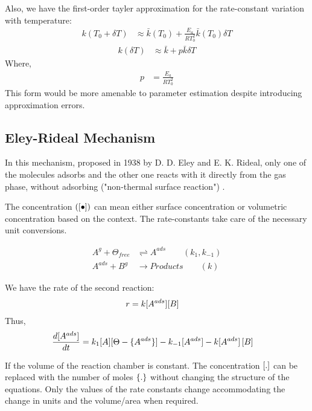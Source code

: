Also, we have the first-order tayler approximation for the rate-constant
variation with temperature:
\begin{align*}
    k(T_0 + \delta T) &\approx \bar k(T_0) + \frac{E_a}{RT_0^2} \bar k(T_0) \delta T
\end{align*}
\begin{align}
    k(\delta T) &\approx \bar k + p \bar k \delta T
\end{align}
Where,
\begin{align*}
    p &= \frac{E_a}{RT_0^2}
\end{align*}
This form would be more amenable to parameter estimation despite introducing
approximation errors.



\subsection{Eley-Rideal Mechanism}
In this mechanism, proposed in 1938 by D. D. Eley and E. K. Rideal, only one of
the molecules adsorbs and the other one reacts with it directly from the gas
phase, without adsorbing ("non-thermal surface reaction") \cite{eley_rideal}.

 The concentration $(\left[ \bullet \right])$ can mean either surface
concentration or volumetric concentration based on the context. The
rate-constants take care of the necessary unit conversions.

\begin{align*}
    A^{g} + \Theta_{free} &\rightleftharpoons A^{ads}  \qquad (k_1, k_{-1})\\
    A^{ads} + B^{g} &\longrightarrow Products \qquad (k)
\end{align*}

We have the rate of the second reaction:
\begin{align*}
    r &= k [A^{ads}] [B]
\end{align*}
Thus,
\begin{align*}
    \frac{d [A^{ads}]}{dt} &= k_1 [A] [\Theta - \{A^{ads}\}] - k_{-1} [A^{ads}] - k [A^{ads}] \left[ B \right]
\end{align*}

 If the volume of the reaction chamber is constant. The
concentration $[.]$ can be replaced with the number of moles $\{.\}$ without changing the structure of the equations. Only the values of the rate
constants change accommodating the change in units and the volume/area when required.

